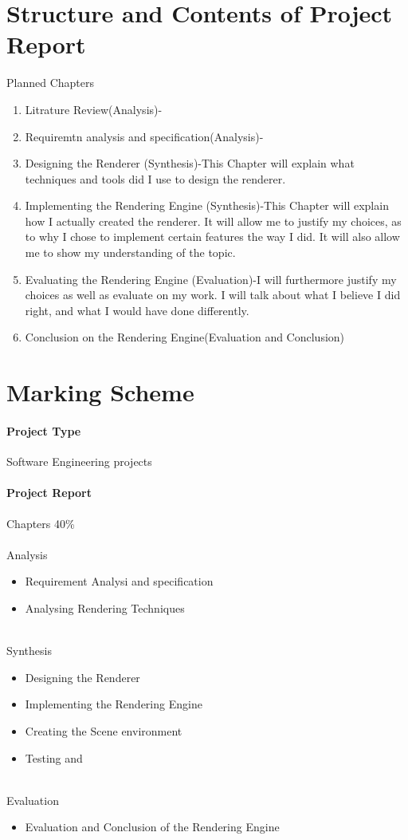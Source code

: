 \documentclass[]{article}
\begin{document}
\section{Structure and Contents of Project Report}
Planned Chapters
\begin{enumerate}
  \item Litrature Review(Analysis)-
  \item Requiremtn analysis and specification(Analysis)-
  \item Designing the Renderer (Synthesis)-This Chapter will explain what techniques and tools did I use to design the renderer. 
  \item Implementing the Rendering Engine (Synthesis)-This Chapter will explain how I actually created the renderer. It will allow me to justify my choices, as to why I chose to implement certain features the way I did. It will also allow me to show my understanding of the topic.
 
  \item Evaluating the Rendering Engine (Evaluation)-I will furthermore justify my choices as well as evaluate on my work. I will talk about what I believe I did right, and what I would have done differently.
  \item Conclusion on the Rendering Engine(Evaluation and Conclusion)
\end{enumerate}

\section{Marking Scheme}
\paragraph{Project Type}Software Engineering projects
\paragraph{Project Report}Chapters 40\% \\
\\
Analysis 
\begin{itemize}
  \item Requirement Analysi and specification
  \item Analysing Rendering Techniques
\end{itemize}
\\
Synthesis 
\begin{itemize}
  \item Designing the Renderer
  \item Implementing the Rendering Engine
  \item Creating the Scene environment
  \item Testing and 
\end{itemize}
\\
Evaluation
\begin{itemize}
    \item Evaluation and Conclusion of the Rendering Engine
\end{itemize}
\end{document}
